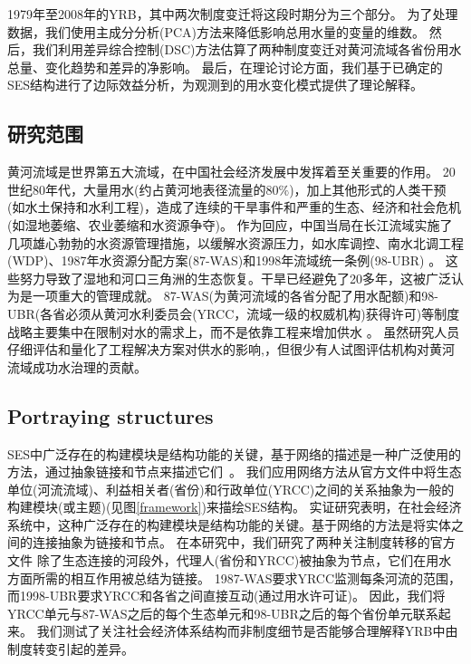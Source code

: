 
1979年至2008年的YRB，其中两次制度变迁将这段时期分为三个部分。
为了处理数据，我们使用主成分分析(PCA)方法来降低影响总用水量的变量的维数。
然后，我们利用差异综合控制(DSC)方法\cite{arkhangelsky2021}估算了两种制度变迁对黄河流域各省份用水总量、变化趋势和差异的净影响。
最后，在理论讨论方面，我们基于已确定的SES结构进行了边际效益分析，为观测到的用水变化模式提供了理论解释。

\subsection{研究范围}\label{sec:yrb}

黄河流域是世界第五大流域，在中国社会经济发展中发挥着至关重要的作用。
20世纪80年代，大量用水(约占黄河地表径流量的$80\%$)，加上其他形式的人类干预(如水土保持和水利工程)，造成了连续的干旱事件和严重的生态、经济和社会危机(如湿地萎缩、农业萎缩和水资源争夺)。
作为回应，中国当局在长江流域实施了几项雄心勃勃的水资源管理措施，以缓解水资源压力，如水库调控、南水北调工程(WDP)、1987年水资源分配方案(87-WAS)和1998年流域统一条例(98-UBR) \cite{long2020, wang2019d}。
这些努力导致了湿地和河口三角洲的生态恢复。干旱已经避免了20多年，这被广泛认为是一项重大的管理成就。
87-WAS(为黄河流域的各省分配了用水配额)和98-UBR(各省必须从黄河水利委员会(YRCC，流域一级的权威机构)获得许可)等制度战略主要集中在限制对水的需求上，而不是依靠工程来增加供水 \cite{bouckaert2022, speed2013}。
虽然研究人员仔细评估和量化了工程解决方案对供水的影响\cite{long2020},，但很少有人试图评估机构对黄河流域成功水治理的贡献。

\subsection{Portraying structures}\label{sec:structures}
SES中广泛存在的构建模块是结构功能的关键，基于网络的描述是一种广泛使用的方法，通过抽象链接和节点来描述它们~\cite{bodin2017a,kluger2020,guerrero2015}。
我们应用网络方法\cite{bodin2017b}从官方文件中将生态单位(河流流域)、利益相关者(省份)和行政单位(YRCC)之间的关系抽象为一般的构建模块(或主题)(见图\ref{framework})来描绘SES结构。
实证研究表明，在社会经济系统中，这种广泛存在的构建模块是结构功能的关键。基于网络的方法是将实体之间的连接抽象为链接和节点\cite{bodin2017a,kluger2020,guerrero2015}。
在本研究中，我们研究了两种关注制度转移的官方文件
除了生态连接的河段外，代理人(省份和YRCC)被抽象为节点，它们在用水方面所需的相互作用被总结为链接。
1987-WAS要求YRCC监测每条河流的范围，而1998-UBR要求YRCC和各省之间直接互动(通过用水许可证)。
因此，我们将YRCC单元与87-WAS之后的每个生态单元和98-UBR之后的每个省份单元联系起来。
我们测试了关注社会经济体系结构而非制度细节是否能够合理解释YRB中由制度转变引起的差异。

